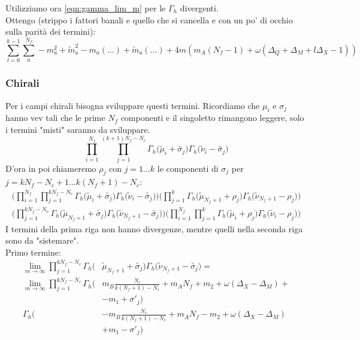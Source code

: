 \documentclass[a4paper,12pt]{article}
\begin{document}
Utilizziamo ora \ref{eqn:gamma_lim_m} per le $\Gamma_h$ divergenti.\\
Ottengo (strippo i fattori banali e quello che si cancella e con un po' di occhio sulla parità dei termini):
\begin{equation}
\sum_{l=0}^{k-1} \sum_a^{N_f}  - m_a^2 + \tilde{m}_a^2  -  m_a(\dots) + \tilde{m}_a(\dots) + 4  m ( m_A (N_f - 1)  + \omega( \Delta_Q +  \Delta_M + l\Delta_X  -1)  )
\label{eqn:contributo_mesoni}
\end{equation}

\subsubsection{Chirali}
Per i campi chirali bisogna sviluppare questi termini. Ricordiamo che $\mu_i$ e $\sigma_j$ hanno vev tali che le prime $N_f$ componenti e il singoletto rimangono leggere, solo i termini "misti" saranno da sviluppare.  
\begin{equation}
\prod_{i=1}^{N_f} \prod_{j=1}^{(k+1)N_f - N_c } \Gamma_h \big( \tilde \mu_i + \tilde{\sigma_j} \big) \Gamma_h \big( \tilde \nu_i - \tilde{\sigma_j} \big)  
\end{equation}
D'ora in poi chiameremo $\rho_j$ con $j= 1 \dots k$ le componenti di $\sigma_j$ per $ j = k N_f - N_c + 1 \dots k(N_f+1) -N_c$:
\begin{align*}
\bigg( \prod_{i=1}^{N_f} \prod_{j=1}^{k N_f - N_c } \Gamma_h \big( \tilde \mu_i + \tilde{\sigma_j} \big) \Gamma_h \big( \tilde \nu_i - \tilde{\sigma_j} \big) \bigg)
\bigg(\prod_{j=1}^{k} \Gamma_h \big( \tilde \mu_{N_f+1} + \rho_j \big) \Gamma_h \big( \tilde \nu_{N_f+1} - \rho_j \big) \bigg)\\
\bigg( \prod_{j=1}^{k N_f - N_c}   \Gamma_h \big( \tilde \mu_{N_f+1} + \tilde{\sigma_j} \big) \Gamma_h \big( \tilde \nu_{N_f+1} - \tilde{\sigma_j} \big) \bigg)
\bigg( \prod_{i=1}^{N_f} \prod_{j=1}^{k } \Gamma_h \big( \tilde \mu_i + \rho_j \big) \Gamma_h \big( \tilde \nu_i - \rho_j \big) \bigg)
\end{align*}
I termini della prima riga non hanno divergenze, mentre quelli nella seconda riga sono da "sistemare".\\
Primo termine:
\begin{align*}
\lim_{m \rightarrow \infty} \prod_{j=1}^{k N_f - N_c}   \Gamma_h \big(& \tilde \mu_{N_f+1} + \tilde{\sigma_j} \big) \Gamma_h \big( \tilde \nu_{N_f+1} - \tilde{\sigma_j} \big) =  \\
 \lim_{m \rightarrow \infty} \prod_{j=1}^{k N_f - N_c}   \Gamma_h \big(& m_B \frac{N_c}{k(N_f+1)-N_c } + m_A N_f + m_2 + \omega ( \Delta_X - \Delta_M) + \\
& - m_1   + \sigma'_j \big) 
 \\
 \Gamma_h \big( &-  m_B \frac{N_c}{k(N_f+1)-N_c } + m_A N_f - m_2 + \omega ( \Delta_X - \Delta_M)  \\
&+ m_1  - \sigma'_j \big) 
\end{align*}
\end{document}

